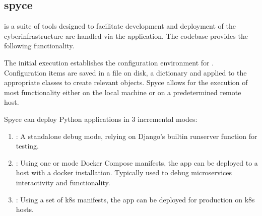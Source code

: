 \documentclass[letterpaper,12pt,english,openany,oneside]{sphinxmanual}
\begin{document}
\sphinxstepscope


\subsection{spyce}
\label{\detokenize{euidev/development/_autosummary/spyce:module-spyce}}\label{\detokenize{euidev/development/_autosummary/spyce:spyce}}\label{\detokenize{euidev/development/_autosummary/spyce::doc}}
\sphinxAtStartPar
{} is a suite of tools designed to facilitate development and deployment of the  cyberinfrastructure are handled via the   application. The   codebase provides the following functionality.

\sphinxAtStartPar
The initial execution establishes the configuration environment for . Configuration items are saved in a  file on disk, a  dictionary and applied to the appropriate classes to create relevant objects. Spyce allows for the execution of most functionality either on the local machine or on a pre\sphinxhyphen{}determined remote host.

\sphinxAtStartPar
Spyce can deploy Python applications in 3 incremental modes:
\begin{enumerate}
%
\item {} 
\sphinxAtStartPar
{}: A stand\sphinxhyphen{}alone debug mode, relying on Django’s built\sphinxhyphen{}in runserver function for testing.

\item {} 
\sphinxAtStartPar
{}: Using one or mode Docker Compose manifests, the app can be deployed to a host with a docker installation. Typically used to debug microservices interactivity and functionality.

\item {} 
\sphinxAtStartPar
{}: Using a set of k8s manifests, the app can be deployed for production on k8s hosts.

\end{enumerate}
\end{document}
